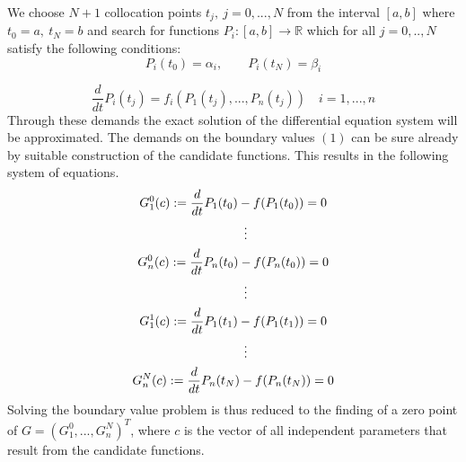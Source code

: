\documentclass[letterpaper,10pt,english]{sphinxmanual}
\begin{document}
We choose \(N+1\) collocation points \(t_j,\ j = 0,...,N\) from the interval
\([a, b]\) where \(t_0 = a,\ t_{N} = b\) and search for functions
\(P_i:[a,b] \rightarrow \mathbb{R}\) which for all \(j = 0,..,N\) satisfy the
following conditions:
\begin{equation}
   P_i(t_0) = \alpha_i, \qquad P_i(t_N) = \beta_i
\end{equation}

\begin{equation}
   \frac{d}{d t} P_i(t_j) = f_i(P_1(t_j),...,P_n(t_j)) \quad i = 1,...,n
\end{equation}
Through these demands the exact solution of the differential equation system will be approximated.
The demands on the boundary values \((1)\) can be sure already by suitable
construction of the candidate functions. This results in the following system of equations.
\begin{gather}
\begin{split}G_1^0(c) := \frac{d}{d t}P_1(t_0) - f(P_1(t_0)) = 0\end{split}\notag\\\begin{split}\qquad \vdots\end{split}\notag\\\begin{split}G_n^0(c) := \frac{d}{d t}P_n(t_0) - f(P_n(t_0)) = 0\end{split}\notag\\\begin{split}\qquad \vdots\end{split}\notag\\\begin{split}G_1^1(c) := \frac{d}{d t}P_1(t_1) - f(P_1(t_1)) = 0\end{split}\notag\\\begin{split}\qquad \vdots\end{split}\notag\\\begin{split}G_n^N(c) := \frac{d}{d t}P_n(t_N) - f(P_n(t_N)) = 0\end{split}\notag
\end{gather}
Solving the boundary value problem is thus reduced to the finding of a zero point
of \(G = (G_1^0 ,..., G_n^N)^T\), where \(c\) is the vector of all independent
parameters that result from the candidate functions.
\end{document}
